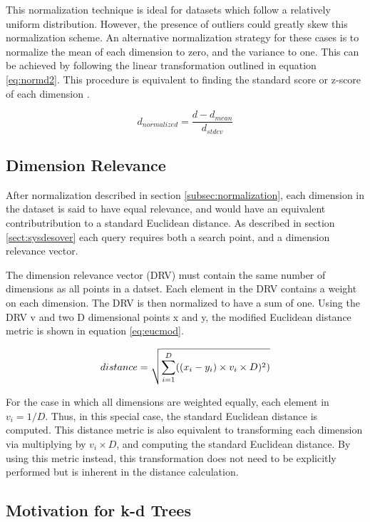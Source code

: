 This normalization technique is ideal for datasets which follow a relatively uniform distribution.  However, the presence of outliers could greatly skew this normalization scheme.  An alternative normalization strategy for these cases is to normalize the mean of each dimension to zero, and the variance to one.  This can be achieved by following the linear transformation outlined in equation \ref{eq:normd2}.  This procedure is equivalent to finding the standard score or z-score of each dimension \citep{cheadle2003analysis}.

\begin{equation}
\label{eq:normd2}
d_{normalized} = \dfrac{d-d_{mean}}{ d_{stdev} }
\end{equation}

\subsection{Dimension Relevance}
\label{subsec:dimrel}

After normalization described in section \ref{subsec:normalization}, each dimension in the dataset is said to have equal relevance, and would have an equivalent contributribution to a standard Euclidean distance.  As described in section \ref{sect:sysdesover} each query requires both a search point, and a dimension relevance vector.

The dimension relevance vector (DRV) must contain the same number of dimensions as all points in a datset.  Each element in the DRV contains a weight on each dimension.  The DRV is then normalized to have a sum of one.  Using the DRV v and two D dimensional points x and y, the modified Euclidean distance metric is shown in equation \ref{eq:eucmod}.

\begin{equation}
\label{eq:eucmod}
distance = \sqrt{\sum\limits_{i=1}^D ((x_i - y_i) \times v_i \times D)^2)} \\
\end{equation}

For the case in which all dimensions are weighted equally, each element in $v_i=1/D$.  Thus, in this special case, the standard Euclidean distance is computed.  This distance metric is also equivalent to transforming each dimension via multiplying by $v_i \times D$, and computing the standard Euclidean distance.  By using this metric instead, this transformation does not need to be explicitly performed but is inherent in the distance calculation.

\subsection{Motivation for k-d Trees}

